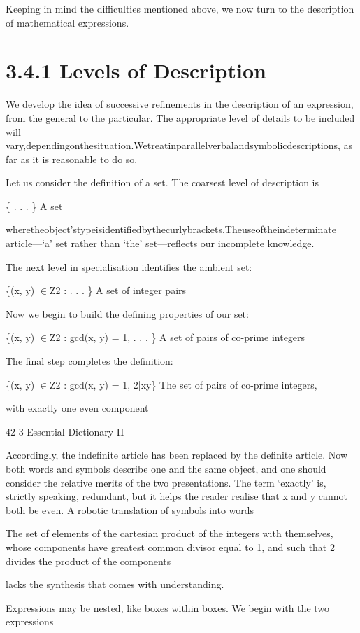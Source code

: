 \documentclass[11pt]{article}
\theoremstyle{plain}
\theoremstyle{definition}
\begin{document}
Keeping in mind the difficulties mentioned above, we now turn to the description of mathematical expressions.

\section{3.4.1 Levels of Description}

We develop the idea of successive refinements in the description of an expression, from the general to the particular. The appropriate level of details to be included will vary,dependingonthesituation.Wetreatinparallelverbalandsymbolicdescriptions, as far as it is reasonable to do so.

Let us consider the definition of a set. The coarsest level of description is

\{ . . . \} A set

wheretheobject'stypeisidentifiedbythecurlybrackets.Theuseoftheindeterminate article---`a' set rather than `the' set---reflects our incomplete knowledge.

The next level in specialisation identifies the ambient set:

\{(x, y) $\in$Z2 : . . . \} A set of integer pairs

Now we begin to build the defining properties of our set:

\{(x, y) $\in$Z2 : gcd(x, y) = 1, . . . \} A set of pairs of co-prime integers

The final step completes the definition:

\{(x, y) $\in$Z2 : gcd(x, y) = 1, 2|xy\} The set of pairs of co-prime integers,

with exactly one even component

42 3 Essential Dictionary II

Accordingly, the indefinite article has been replaced by the definite article. Now both words and symbols describe one and the same object, and one should consider the relative merits of the two presentations. The term `exactly' is, strictly speaking, redundant, but it helps the reader realise that x and y cannot both be even. A robotic translation of symbols into words

The set of elements of the cartesian product of the integers with themselves, whose components have greatest common divisor equal to 1, and such that 2 divides the product of the components

lacks the synthesis that comes with understanding.

Expressions may be nested, like boxes within boxes. We begin with the two expressions
\end{document}
